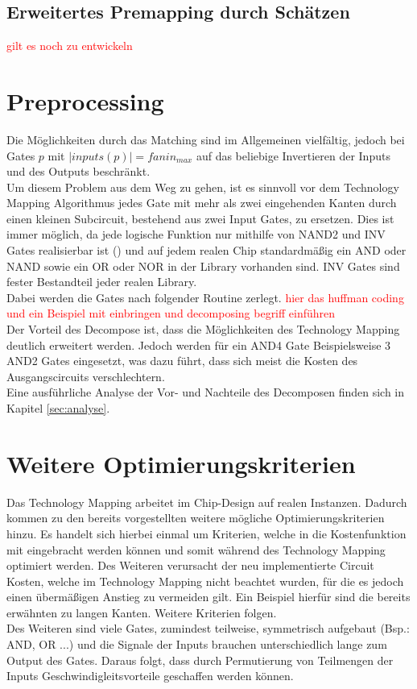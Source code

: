 \documentclass[11pt, a4paper, german]{article}
\newcommand{\TM}{Technology  Mapping }
\begin{document}
\subsection{Erweitertes Premapping durch Schätzen}
\label{subsec:erweitertes_premapping_durch_schaetzen}
\textcolor{red}{gilt es noch zu entwickeln} 

\section{Preprocessing}
Die Möglichkeiten durch das Matching sind im Allgemeinen vielfältig, jedoch bei Gates $p$ mit $|inputs(p)| = fanin_{max}$ auf das beliebige Invertieren der Inputs und des Outputs beschränkt. \\
Um diesem Problem aus dem Weg zu gehen, ist es sinnvoll vor dem \TM Algorithmus jedes Gate mit mehr als zwei eingehenden Kanten durch einen kleinen Subcircuit, bestehend aus zwei Input Gates, zu ersetzen. Dies ist immer möglich, da jede logische Funktion nur mithilfe von NAND2 und INV Gates realisierbar ist (\cite{Post}) und auf jedem realen Chip standardmäßig ein AND oder NAND sowie ein OR oder NOR in der Library vorhanden sind. INV Gates sind fester Bestandteil jeder realen Library.\\
Dabei werden die Gates nach folgender Routine zerlegt. \textcolor{red}{hier das huffman coding und ein Beispiel mit einbringen und decomposing begriff einführen}\\
Der Vorteil des Decompose ist, dass die Möglichkeiten des \TM deutlich erweitert werden. Jedoch werden für ein AND4 Gate Beispielsweise 3 AND2 Gates eingesetzt, was dazu führt, dass sich meist die Kosten des Ausgangscircuits verschlechtern.\\
Eine ausführliche Analyse der Vor- und Nachteile des Decomposen finden sich in Kapitel \ref{sec:analyse}.
	

\section{Weitere Optimierungskriterien}
\label{sec:weitere_opt_krit}
Das \TM arbeitet im Chip-Design auf realen Instanzen. Dadurch kommen zu den bereits vorgestellten weitere mögliche Optimierungskriterien hinzu. Es handelt sich hierbei einmal um Kriterien, welche in die Kostenfunktion mit eingebracht werden können und somit während des \TM optimiert werden. Des Weiteren verursacht der neu implementierte Circuit Kosten, welche im \TM nicht beachtet wurden, für die es jedoch einen übermäßigen Anstieg zu vermeiden gilt. Ein Beispiel hierfür sind die bereits erwähnten zu langen Kanten. Weitere Kriterien folgen.\\
Des Weiteren sind viele Gates, zumindest teilweise, symmetrisch aufgebaut (Bsp.: AND, OR ...) und die Signale der Inputs brauchen unterschiedlich lange zum Output des Gates. Daraus folgt, dass durch Permutierung von Teilmengen der Inputs Geschwindigleitsvorteile geschaffen werden können.  
\end{document}
